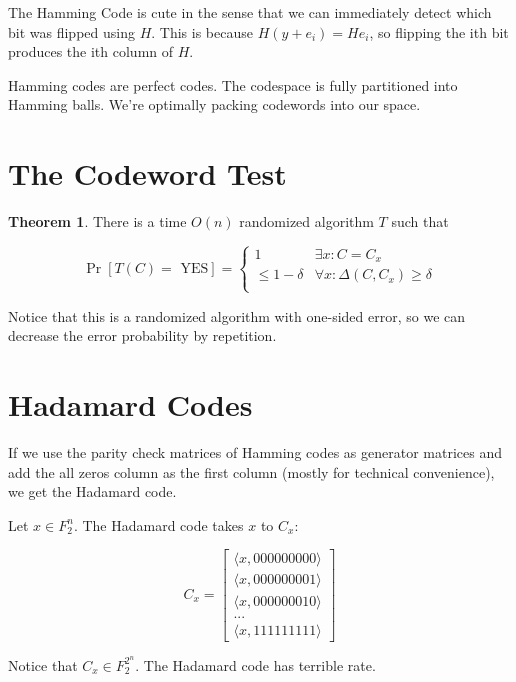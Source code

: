 \documentclass{article}
\theoremstyle{definition}
\newtheorem{theorem}{Theorem}[section]
\begin{document}
The Hamming Code is cute in the sense that we can immediately detect which bit was
flipped using $H$. This is because $H(y + e_{i}) = He_{i}$, so flipping the ith bit
produces the ith column of $H$.

Hamming codes are perfect codes. The codespace is fully partitioned into Hamming balls.
We're optimally packing codewords into our space.

\newpage

\section{The Codeword Test}

\begin{theorem}
    There is a time $O(n)$ randomized algorithm $T$ such that

    \[ \Pr[T(C) = \text{ YES}] = \begin{cases} 
        1 & \exists x: C = C_{x} \\
        \leq 1 - \delta & \forall x: \Delta(C,C_{x}) \geq \delta \\
     \end{cases}\] 
\end{theorem}

Notice that this is a randomized algorithm with one-sided error, so we can decrease the
error probability by repetition.



\newpage

\section{Hadamard Codes}

If we use the parity check matrices of Hamming codes as generator matrices and add the
all zeros column as the first column (mostly for technical convenience), we get
the Hadamard code.

Let $x \in F_{2}^{n}$. The Hadamard code takes $x$ to $C_{x}$:

\[ C_{x} = \begin{bmatrix}
    \langle x, 000000000 \rangle \\ 
    \langle x, 000000001 \rangle \\
    \langle x, 000000010 \rangle \\
    ... \\
    \langle x, 111111111 \rangle
\end{bmatrix}\]

Notice that $C_{x} \in F_{2}^{2^{n}}$. The Hadamard code has terrible rate.
\end{document}
